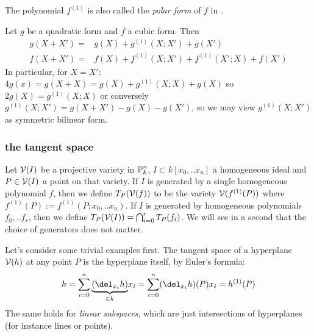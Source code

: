 \begin{remark}
The polynomial $f^{(1)}$ is also called the \emph{polar form} of $f$ in \cite[p. 104]{reid1988undergraduate}.
\end{remark}

\begin{corollary} \label{corollaryTaylorForQuadricAndCubic}
Let $g$ be a quadratic form and $f$ a cubic form. Then
\begin{align}
g(X+X') =& g(X) + g^{(1)}(X;X') + g(X')
\\ f(X+X') =& f(X) + f^{(1)}(X;X') + f^{(1)}(X';X) + f(X')
\end{align}
In particular, for $X=X'$: $4g(x) = g(X+X) = g(X) + g^{(1)}(X;X) + g(X)$ so $2g(X) = g^{(1)}(X;X)$ or conversely $g^{(1)}(X;X') = g(X+X') - g(X) - g(X')$, so we may view $g^{(1)}(X;X')$ as symmetric bilinear form.
\end{corollary}


\subsubsection{the tangent space}

\begin{definition} \label{definitionTangentSpace}
Let $\operatorname{\mathcal V}(I)$ be a projective variety in $\operatorname{\mathbb P}^n_k$, $I \subset k[x_0,..x_n]$ a homogeneous ideal and $P\in \operatorname{\mathcal V}(I)$ a point on that variety.
If $I$ is generated by a single homogeneous polynomial $f$, then we define $T_P(\operatorname{\mathcal V}(f))$ to be the variety $\operatorname{\mathcal V}(f^{(1)}(P))$ where $f^{(1)}(P) := f^{(1)}(P;x_0,..x_n)$.
If $I$ is generated by homogeneous polynomials $f_0,..f_r$, then we define $T_P(\operatorname{\mathcal V}(I)) = \bigcap_{i=0}^r T_P(f_i)$.
We will see in a second that the choice of generators does not matter.
\end{definition}

\begin{example} \label{exampleTangentPlaneOfLinearSubsets}
Let's consider some trivial examples first.
The tangent space of a hyperplane $\operatorname{\mathcal V}(h)$ at any point $P$ is the hyperplane itself, by Euler's formula:
\begin{equation}
h = \sum_{i=0}^n \underset{\in k}{\underbrace{(\del_{x_i}h)}}x_i = \sum_{i=0}^n (\del_{x_i}h)(P) x_i = h^{(1)}(P)
\end{equation}
The same holds for \emph{linear subspaces}, which are just intersections of hyperplanes (for instance lines or points).
\end{example}

